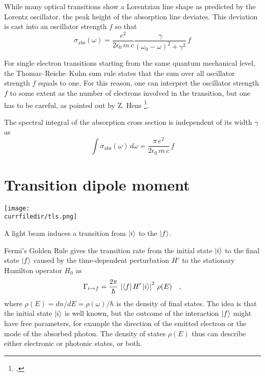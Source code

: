 While many optical transitions show a Lorentzian line shape as predicted by the Lorentz oscillator, the peak height of the absorption line deviates. This deviation is cast into an oscillator strength $f$ so that 
\begin{equation}
 \sigma_{\text{abs}}(\omega) =   \frac{e^2  }{2 \epsilon_0 \,  m \, c}  \frac{\gamma  }{(\omega_0 - \omega)^2 +  \gamma ^2}  \, f
\end{equation}

For single electron transitions starting from the same quantum mechanical level, the Thomas–Reiche–Kuhn sum rule states that the sum over all oscillator strength $f$ equals to one. For this reason, one can interpret the oscillator strength  $f$  to some extent  as the number of electrons involved in  the transition, but one has to be careful, as pointed out by Z. Hens \footcite{Hens:2008kr}.

The spectral integral of the absorption cross section is independent of its width $\gamma$ as
\begin{equation}
 \int \sigma_{\text{abs}}(\omega)  \, d \omega =
   \frac{\pi \, e^2  }{2 \epsilon_0 \,  m \, c} \, f
\end{equation}


\section{Transition dipole moment}

\begin{marginfigure}
\texttt{[image: \\currfiledir/tls.png]}
\caption{A light beam induces a transition from $\ket{i}$ to the  $\ket{f}$.}
\end{marginfigure}

Fermi's Golden Rule gives the transition rate from the initial state $\ket{i}$ to the final state $\ket{f}$ caused by the time-dependent perturbation $H'$ to the stationary Hamilton operator $H_0$ as
\begin{equation}
 \Gamma_{i \rightarrow f} = \frac{2 \pi}{\hbar} \, \left| \bra{f} H' \ket{i} \right|^2 \, \rho(E) \quad ,
\end{equation}
where  $\rho(E) = d n / d E = \rho(\omega) / \hbar$ is the density of final states. The idea is that the initial state  $\ket{i}$ is well known, but the outcome of the interaction $\ket{f}$ might have free parameters, for example the direction of the emitted electron or the mode of the absorbed photon. The density of states   $\rho(E)$ thus can describe either electronic or photonic states, or both.




